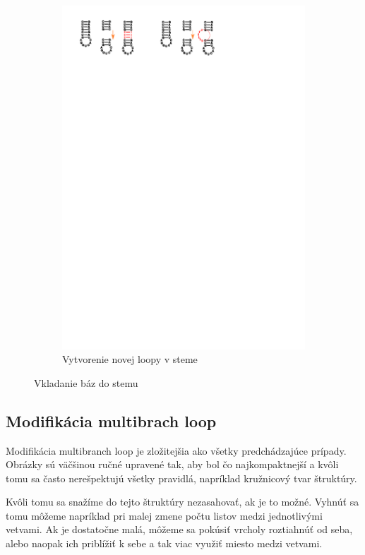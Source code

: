 \begin{figure}
\begin{subfigure}{\wi}
    \includegraphics[clip, trim=8cm 25cm 7cm 1cm, width=1\textwidth]{../img/alg/insert/stem}
    \caption{Vytvorenie novej loopy v steme}
  \end{subfigure}
  \caption{Vkladanie báz do stemu}
  \label{obr:insert_stem}
\end{figure}




\subsection{Modifikácia multibrach loop}

Modifikácia multibranch loop je zložitejšia ako všetky predchádzajúce prípady.
Obrázky sú väčšinou ručné upravené tak, aby bol čo najkompaktnejší a kvôli tomu
sa často nerešpektujú všetky pravidlá, napríklad kružnicový tvar štruktúry.

Kvôli tomu sa snažíme do tejto štruktúry nezasahovať, ak je to možné.
Vyhnúť sa tomu môžeme napríklad pri malej zmene počtu listov medzi jednotlivými vetvami.
Ak je dostatočne malá, môžeme sa pokúsiť vrcholy roztiahnúť od seba, alebo naopak ich
priblížiť k sebe a tak viac využiť miesto medzi vetvami.


